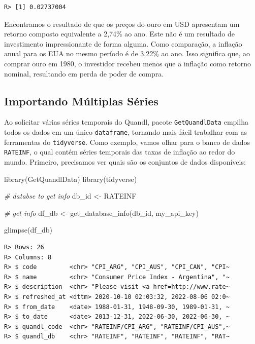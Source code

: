\documentclass[
  11pt,
]{book}
\newenvironment{Shaded}{\begin{snugshade}}{\end{snugshade}}
\newcommand{\CommentTok}[1]{\textcolor[rgb]{0.37,0.37,0.37}{\textit{#1}}}
\newcommand{\FunctionTok}[1]{\textcolor[rgb]{0,0,0}{#1}}
\newcommand{\NormalTok}[1]{#1}
\newcommand{\OtherTok}[1]{\textcolor[rgb]{0.37,0.37,0.37}{#1}}
\newcommand{\StringTok}[1]{\textcolor[rgb]{0.5,0.5,0.5}{#1}}
\begin{document}
\begin{verbatim}
R> [1] 0.02737004
\end{verbatim}

Encontramos o resultado de que os preços do ouro em USD apresentam um retorno composto equivalente a 2,74\% ao ano. Este não é um resultado de investimento impressionante de forma alguma. Como comparação, a inflação anual para os EUA no mesmo período é de 3,22\% ao ano. Isso significa que, ao comprar ouro em 1980, o investidor recebeu menos que a inflação como retorno nominal, resultando em perda de poder de compra.

\hypertarget{importando-muxfaltiplas-suxe9ries}{%
\subsection{Importando Múltiplas Séries}\label{importando-muxfaltiplas-suxe9ries}}

Ao solicitar várias séries temporais do Quandl, pacote \texttt{GetQuandlData} empilha todos os dados em um único \texttt{dataframe}, tornando mais fácil trabalhar com as ferramentas do \texttt{tidyverse}. Como exemplo, vamos olhar para o banco de dados \texttt{RATEINF}, o qual contém séries temporais das taxas de inflação ao redor do mundo. Primeiro, precisamos ver quais são os conjuntos de dados disponíveis:

\begin{Shaded}
\begin{Highlighting}[]
\FunctionTok{library}\NormalTok{(GetQuandlData)}
\FunctionTok{library}\NormalTok{(tidyverse)}

\CommentTok{\# databse to get info}
\NormalTok{db\_id }\OtherTok{\textless{}{-}} \StringTok{\textquotesingle{}RATEINF\textquotesingle{}}

\CommentTok{\# get info }
\NormalTok{df\_db }\OtherTok{\textless{}{-}} \FunctionTok{get\_database\_info}\NormalTok{(db\_id, my\_api\_key)}

\FunctionTok{glimpse}\NormalTok{(df\_db)}
\end{Highlighting}
\end{Shaded}

\begin{verbatim}
R> Rows: 26
R> Columns: 8
R> $ code         <chr> "CPI_ARG", "CPI_AUS", "CPI_CAN", "CPI~
R> $ name         <chr> "Consumer Price Index - Argentina", "~
R> $ description  <chr> "Please visit <a href=http://www.rate~
R> $ refreshed_at <dttm> 2020-10-10 02:03:32, 2022-08-06 02:0~
R> $ from_date    <date> 1988-01-31, 1948-09-30, 1989-01-31, ~
R> $ to_date      <date> 2013-12-31, 2022-06-30, 2022-06-30, ~
R> $ quandl_code  <chr> "RATEINF/CPI_ARG", "RATEINF/CPI_AUS",~
R> $ quandl_db    <chr> "RATEINF", "RATEINF", "RATEINF", "RAT~
\end{verbatim}
\end{document}
